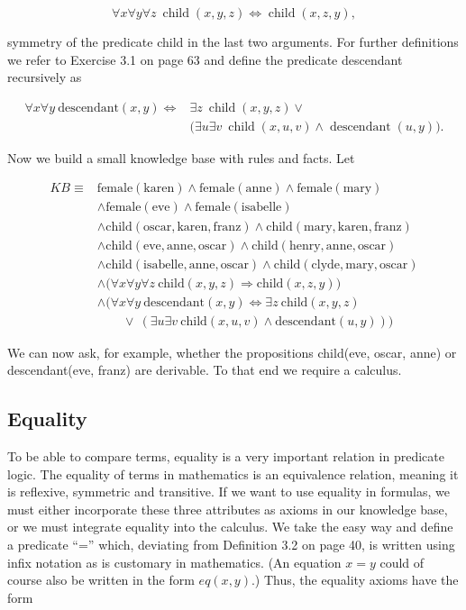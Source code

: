 \documentclass[10pt]{book}
\begin{document}
$$
\forall x \forall y \forall z \ \operatorname{child}(x,y,z) \Leftrightarrow \operatorname{child}(x,z,y),
$$

symmetry of the predicate child in the last two arguments. For further definitions we refer to Exercise 3.1 on page 63 and define the predicate descendant recursively as

\[
\begin{aligned}
\forall x \forall y \ \text{descendant}(x,y) \Leftrightarrow {} & \exists z \ \operatorname{child}(x,y,z) \vee{} \\
& \bigl(\exists u \exists v \ \operatorname{child}(x,u,v) \wedge \operatorname{descendant}(u,y)\bigr).
\end{aligned}
\]

Now we build a small knowledge base with rules and facts. Let

\[
\begin{aligned}
K B \equiv {} & \text{female}(\text{karen}) \wedge \text{female}(\text{anne}) \wedge \text{female}(\text{mary}) \\
& \wedge \text{female}(\text{eve}) \wedge \text{female}(\text{isabelle}) \\
& \wedge \text{child}(\text{oscar},\text{karen},\text{franz}) \wedge \text{child}(\text{mary},\text{karen},\text{franz}) \\
& \wedge \text{child}(\text{eve},\text{anne},\text{oscar}) \wedge \text{child}(\text{henry},\text{anne},\text{oscar}) \\
& \wedge \text{child}(\text{isabelle},\text{anne},\text{oscar}) \wedge \text{child}(\text{clyde},\text{mary},\text{oscar}) \\
& \wedge \bigl(\forall x \forall y \forall z \ \text{child}(x,y,z) \Rightarrow \text{child}(x,z,y)\bigr) \\
& \wedge \bigl(\forall x \forall y \ \text{descendant}(x,y) \Leftrightarrow \exists z \ \text{child}(x,y,z) \\
& \qquad \vee \ (\exists u \exists v \ \text{child}(x,u,v) \wedge \text{descendant}(u,y))\bigr)
\end{aligned}
\]

We can now ask, for example, whether the propositions child(eve, oscar, anne) or descendant(eve, franz) are derivable. To that end we require a calculus.

\subsection{Equality}
To be able to compare terms, equality is a very important relation in predicate logic. The equality of terms in mathematics is an equivalence relation, meaning it is reflexive, symmetric and transitive. If we want to use equality in formulas, we must either incorporate these three attributes as axioms in our knowledge base, or we must integrate equality into the calculus. We take the easy way and define a predicate ``='' which, deviating from Definition 3.2 on page 40, is written using infix notation as is customary in mathematics. (An equation $x=y$ could of course also be written in the form $eq(x,y)$.) Thus, the equality axioms have the form
\end{document}
